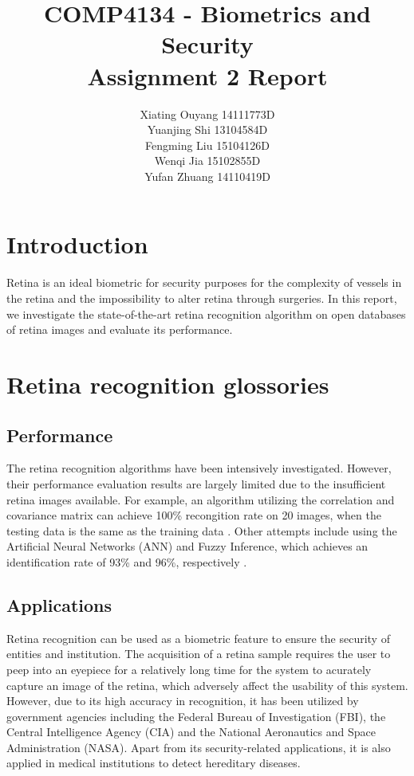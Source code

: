 \documentclass[a4paper,11pt]{article}
\title{\vspace{-2cm}COMP4134 - Biometrics and Security \\ Assignment 2 Report}
\author{
	Xiating Ouyang 14111773D \\
	Yuanjing Shi 13104584D \\
	Fengming Liu 15104126D \\
	Wenqi Jia 15102855D \\
	Yufan Zhuang 14110419D \\
	}
\date{}
\theoremstyle{plain} %
\begin{document}
\maketitle	

\section{Introduction}
Retina is an ideal biometric for security purposes for the complexity of vessels in the retina and the impossibility to alter retina through surgeries. In this report, we investigate the state-of-the-art retina recognition algorithm on open databases of retina images and evaluate its performance.

\section{Retina recognition glossories}

\subsection{Performance}
The retina recognition algorithms have been intensively investigated. However, their performance evaluation results are largely limited due to the insufficient retina images available. For example, an algorithm utilizing the correlation and covariance matrix can achieve 100\% recongition rate on 20 images, when the testing data is the same as the training data \cite{kakarwal2010analysis}. Other attempts include using the Artificial Neural Networks (ANN) and Fuzzy Inference, which achieves an identification rate of 93\% and 96\%, respectively \cite{borah2015retina}.


\subsection{Applications}
Retina recognition can be used as a biometric feature to ensure the security of entities and institution. The acquisition of a retina sample requires the user to peep into an eyepiece for a relatively long time for the system to acurately capture an image of the retina, which adversely affect the usability of this system. However, due to its high accuracy in recognition, it has been utilized by government agencies including the Federal Bureau of Investigation (FBI), the Central Intelligence Agency (CIA) and the National Aeronautics and Space Administration (NASA). Apart from its security-related applications, it is also applied in medical institutions to detect hereditary diseases.
\end{document}
